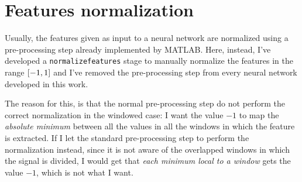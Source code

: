 \section{Features normalization}\label{sec:normalization}

Usually, the features given as input to a neural network are normalized using a
pre-processing step already implemented by MATLAB. Here, instead, I've
developed a \texttt{normalizefeatures} stage to manually normalize the features
in the range \(\interval{-1}{1}\) and I've removed the pre-processing step from
every neural network developed in this work.

The reason for this, is that the normal pre-processing step do not perform the
correct normalization in the windowed case: I want the value \(-1\) to map the
\emph{absolute minimum} between all the values in all the windows in which the
feature is extracted. If I let the standard pre-processing step to perform the
normalization instead, since it is not aware of the overlapped windows in which
the signal is divided, I would get that \emph{each minimum local to a window}
gets the value \(-1\), which is not what I want.
